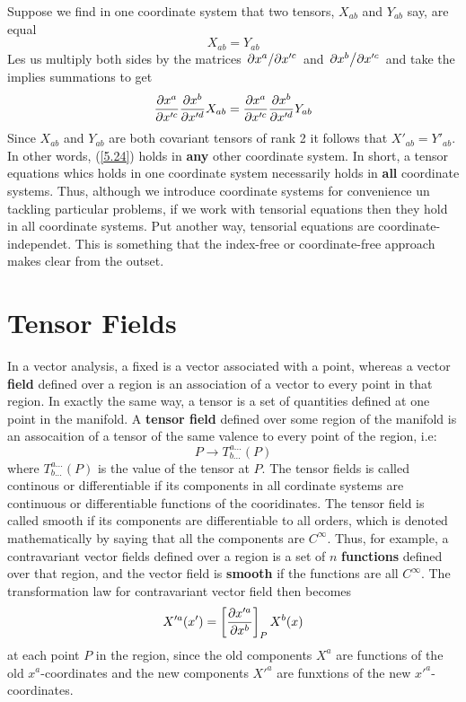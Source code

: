 Suppose we find in one coordinate system that two tensors, $X_{ab}$ and $Y_{ab}$ say, are equal 
\begin{equation}\label{5.24}
  X_{ab}=Y_{ab}
\end{equation}
Les us multiply both sides by the matrices $\pdv*{x^{a}}{x'^c}$ and $\pdv*{x^b}{x'^c}$ and take the implies summations to get
\begin{equation*}
  \pdv{x^{a}}{x'^c}\pdv{x^b}{x'^d}X_{ab}=\pdv{x^{a}}{x'^c}\pdv{x^b}{x'^d}Y_{ab}
\end{equation*}
Since $X_{ab}$ and $Y_{ab}$ are both covariant tensors of rank 2 it follows that $X'_{ab}=Y'_{ab}$. In other words, (\ref{5.24}) holds in \textbf{any} other coordinate system. In short, a tensor equations whics holds in one coordinate system necessarily holds in \textbf{all} coordinate systems. Thus, although we introduce coordinate systems for convenience un tackling particular problems, if we work with tensorial equations then they hold in all coordinate systems. Put another way, tensorial equations are coordinate-independet. This is something that the index-free or coordinate-free approach makes clear from the outset.

\section{Tensor Fields}\label{sec:5.7}
In a vector analysis, a fixed is a vector associated with a point, whereas a vector \textbf{field} defined over a region is an association of a vector to every point in that region. In exactly the same way, a tensor is a set of quantities defined at one point in the manifold. A \textbf{tensor field} defined over some region of the manifold is an assocaition of a tensor of the same valence to every point of the region, i.e: $$P\to T_{b...}^{a...}(P)$$ where $T_{b...}^{a...}(P)$ is the value of the tensor at $P$. The tensor fields is called continous or differentiable if its components in all cordinate systems are continuous  or differentiable functions of the cooridinates. The tensor field is called smooth if its components are differentiable to all orders, which is denoted mathematically by saying that all the components are $C^\infty$. Thus, for example, a contravariant vector fields defined over a region is a set of $n$ \textbf{functions} defined over that region, and the vector field is \textbf{smooth} if the functions are all $C^\infty$. The transformation law for contravariant vector field then becomes
\begin{equation}\label{5.25}
  X'^{a}(x')=\left[\pdv{x'^{a}}{x^b}\right]_PX^b(x)
\end{equation}
at each point $P$ in the region, since the old components $X^{a}$ are functions of the old $x^{a}$-coordinates and the new components $X'^{a}$ are funxtions of the new $x'^{a}$-coordinates.

